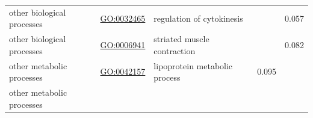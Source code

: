 \documentclass[
]{article}
\begin{document}
\begin{longtable}[]{@{}lllll@{}}
\begin{minipage}[t]{0.17\columnwidth}
other biological processes\strut
\end{minipage} & \begin{minipage}[t]{0.17\columnwidth}\raggedright
\url{GO:0032465}\strut
\end{minipage} & \begin{minipage}[t]{0.17\columnwidth}\raggedright
regulation of cytokinesis\strut
\end{minipage} & \begin{minipage}[t]{0.17\columnwidth}\raggedright
\strut
\end{minipage} & \begin{minipage}[t]{0.17\columnwidth}\raggedright
0.057\strut
\end{minipage}\tabularnewline
\begin{minipage}[t]{0.17\columnwidth}\raggedright
other biological processes\strut
\end{minipage} & \begin{minipage}[t]{0.17\columnwidth}\raggedright
\url{GO:0006941}\strut
\end{minipage} & \begin{minipage}[t]{0.17\columnwidth}\raggedright
striated muscle contraction\strut
\end{minipage} & \begin{minipage}[t]{0.17\columnwidth}\raggedright
\strut
\end{minipage} & \begin{minipage}[t]{0.17\columnwidth}\raggedright
0.082\strut
\end{minipage}\tabularnewline
\begin{minipage}[t]{0.17\columnwidth}\raggedright
other metabolic processes\strut
\end{minipage} & \begin{minipage}[t]{0.17\columnwidth}\raggedright
\url{GO:0042157}\strut
\end{minipage} & \begin{minipage}[t]{0.17\columnwidth}\raggedright
lipoprotein metabolic process\strut
\end{minipage} & \begin{minipage}[t]{0.17\columnwidth}\raggedright
0.095\strut
\end{minipage} & \begin{minipage}[t]{0.17\columnwidth}\raggedright
\strut
\end{minipage}\tabularnewline
\begin{minipage}[t]{0.17\columnwidth}\raggedright
other metabolic processes\strut

\end{minipage}
\end{longtable}
\end{document}
